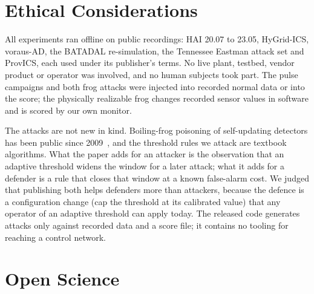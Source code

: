 \documentclass[sigconf,review,anonymous]{acmart}
\begin{document}



\appendix

\section*{Ethical Considerations}

All experiments ran offline on public recordings: HAI 20.07 to 23.05, HyGrid-ICS, voraus-AD, the
BATADAL re-simulation, the Tennessee Eastman attack set and ProvICS, each used under its publisher's
terms. No live plant, testbed, vendor product
or operator was involved, and no human subjects took part. The pulse campaigns and both frog attacks
were injected into recorded normal data or into the score; the physically realizable frog changes
recorded sensor values in software and is scored by our own monitor.

The attacks are not new in kind. Boiling-frog poisoning of self-updating detectors has been public
since 2009~\cite{chantin2009frog, rubinstein2009antidote}, and the threshold rules we attack are
textbook algorithms. What the paper adds for an attacker is the observation that an adaptive
threshold widens the window for a later attack; what it adds for a defender is a rule that closes
that window at a known false-alarm cost. We judged that publishing both helps defenders more than
attackers, because the defence is a configuration change (cap the threshold at its calibrated value)
that any operator of an adaptive threshold can apply today. The released code generates attacks only
against recorded data and a score file; it contains no tooling for reaching a control network.

\section*{Open Science}
\end{document}
